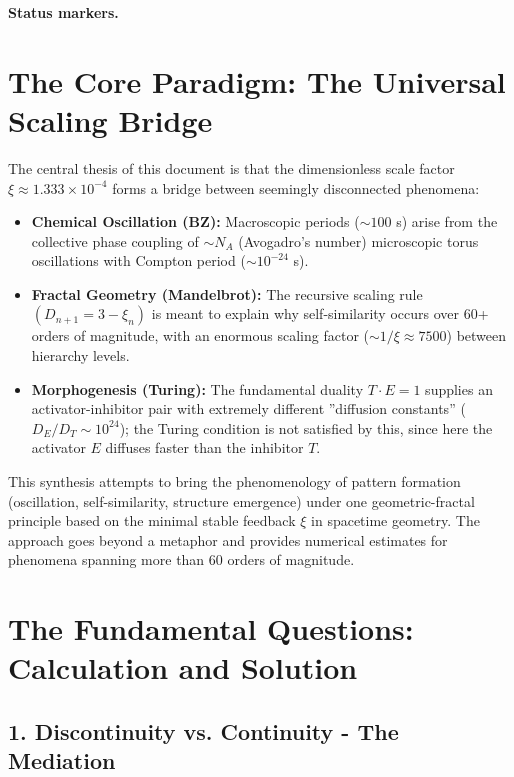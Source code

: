 \medskip\noindent\textbf{Status markers.}


\section*{The Core Paradigm: The Universal Scaling Bridge}
	
	The central thesis of this document is that the dimensionless scale factor $\xi \approx 1.333 \times 10^{-4}$ forms a bridge between seemingly disconnected phenomena:
	
	\begin{itemize}[label=$\bullet$]
		\item \textbf{Chemical Oscillation (BZ):} Macroscopic periods ($\sim 100$ s) arise from the collective phase coupling of $\sim N_A$ (Avogadro's number) microscopic torus oscillations with Compton period ($\sim 10^{-24}$ s).
		
		\item \textbf{Fractal Geometry (Mandelbrot):} The recursive scaling rule $(D_{n+1} = 3 - \xi_n)$ is meant to explain why self-similarity occurs over 60+ orders of magnitude, with an enormous scaling factor ($\sim 1/\xi \approx 7500$) between hierarchy levels.
		
		\item \textbf{Morphogenesis (Turing):} The fundamental duality $T \cdot E = 1$ supplies an activator-inhibitor pair with extremely different ''diffusion constants'' ($D_E/D_T \sim 10^{24}$); the Turing condition is not satisfied by this, since here the activator $E$ diffuses faster than the inhibitor $T$.
	\end{itemize}
	
	This synthesis attempts to bring the phenomenology of pattern formation (oscillation, self-similarity, structure emergence) under one geometric-fractal principle based on the minimal stable feedback $\xi$ in spacetime geometry. The approach goes beyond a metaphor and provides numerical estimates for phenomena spanning more than 60 orders of magnitude.
	
	\section*{The Fundamental Questions: Calculation and Solution}
	
	\subsection*{1. Discontinuity vs. Continuity - The Mediation}
	
